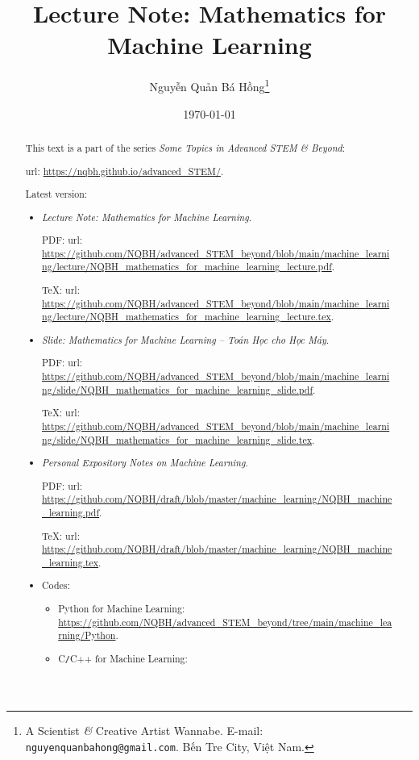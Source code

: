\documentclass{article}
\title{Lecture Note: Mathematics for Machine Learning}
\author{Nguyễn Quản Bá Hồng\footnote{A Scientist {\it\&} Creative Artist Wannabe. E-mail: {\tt nguyenquanbahong@gmail.com}. Bến Tre City, Việt Nam.}}
\date{\today}
\begin{document}
\maketitle
\begin{abstract}
	This text is a part of the series {\it Some Topics in Advanced STEM \& Beyond}:
	
	{\sc url}: \url{https://nqbh.github.io/advanced_STEM/}.
	
	Latest version:
	\begin{itemize}
		\item {\it Lecture Note: Mathematics for Machine Learning}.
		
		PDF: {\sc url}: \url{https://github.com/NQBH/advanced_STEM_beyond/blob/main/machine_learning/lecture/NQBH_mathematics_for_machine_learning_lecture.pdf}.
		
		\TeX: {\sc url}: \url{https://github.com/NQBH/advanced_STEM_beyond/blob/main/machine_learning/lecture/NQBH_mathematics_for_machine_learning_lecture.tex}.
		\item {\it Slide: Mathematics for Machine Learning -- Toán Học cho Học Máy}.
		
		PDF: {\sc url}: \url{https://github.com/NQBH/advanced_STEM_beyond/blob/main/machine_learning/slide/NQBH_mathematics_for_machine_learning_slide.pdf}.
		
		\TeX: {\sc url}: \url{https://github.com/NQBH/advanced_STEM_beyond/blob/main/machine_learning/slide/NQBH_mathematics_for_machine_learning_slide.tex}.
		\item {\it Personal Expository Notes on Machine Learning}.
		
		PDF: {\sc url}: \url{https://github.com/NQBH/draft/blob/master/machine_learning/NQBH_machine_learning.pdf}.
		
		\TeX: {\sc url}: \url{https://github.com/NQBH/draft/blob/master/machine_learning/NQBH_machine_learning.tex}.
		\item Codes:
		\begin{itemize}
			\item Python for Machine Learning: \url{https://github.com/NQBH/advanced_STEM_beyond/tree/main/machine_learning/Python}.
			\item C{\tt/}C++ for Machine Learning:
		\end{itemize}
	\end{itemize}
\end{abstract}
\tableofcontents

\end{document}
